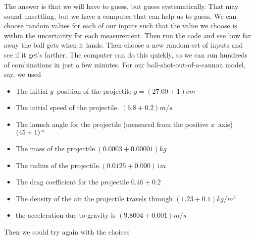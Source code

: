 \documentclass[twoside,11pt,ShortChapTitles]{BYUTextbook}
\begin{document}
The answer is that we will have to guess, but guess systematically. That may
sound unsettling, but we have a computer that can help us to guess. We can
choose random values for each of our inputs such that the value we choose is
within the uncertainty for each measurement. Then run the code and see how
far away the ball gets when it lands. Then choose a new random set of inputs
and see if it get's farther. The computer can do this quickly, so we can run
hundreds of combinations in just a few minutes. For our
ball-shot-out-of-a-cannon model, say, we used

\begin{itemize}
\item {\small The initial }$y${\small \ position of the projectile }$%
y=\left( 27.00+1\right) \unit{cm}$

\item {\small The initial speed of the projectile. }$\left( 6.8+0.2\right) 
\unit{m}/\unit{s}$

\item {\small The launch angle for the projectile (measured from the
positive }$x${\small \ axis) }$\left( 45+1\right) \unit{%
{{}^\circ}%
}$

\item {\small The mass of the projectile.}$\left( 0.0003+0.00001\right) 
\unit{kg}$

\item {\small The radius of the projectile.}$\left( 0.0125+0.000\right) 1%
\unit{m}$

\item {\small The drag coefficient for the projectile }$0.46+0.2$

\item {\small The density of the air the projectile travels through }$\left(
1.23+0.1\right) \unit{kg}/\unit{m}^{3}$

\item {\small the acceleration due to gravity is }$\left(
9.8004+0.001\right) \unit{m}/\unit{s}$
\end{itemize}

Then we could try again with the choices
\end{document}
